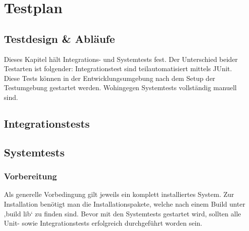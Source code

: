 \section{Testplan}
\subsection{Testdesign \& Abläufe}
Dieses Kapitel hält Integrations- und Systemtests fest. Der Unterschied beider Testarten ist folgender: Integrationstest sind teilautomatisiert mittels JUnit. Diese Tests können in der Entwicklungsumgebung nach dem Setup der Testumgebung gestartet werden. Wohingegen Systemtests vollständig manuell sind.
\subsection{Integrationstests}









\subsection{Systemtests}
\subsubsection{Vorbereitung}
Als generelle Vorbedingung gilt jeweils ein komplett installiertes System. Zur Installation benötigt man die Installationspakete, welche nach einem Build unter ‚build lib‘ zu finden sind. Bevor mit den Systemtests gestartet wird, sollten alle Unit- sowie Integrationstests erfolgreich durchgeführt worden sein.



